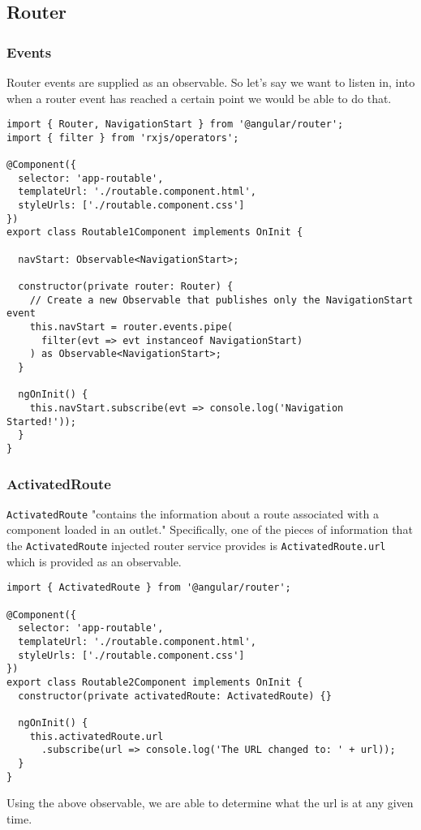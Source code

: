 \subsection{ Router }
\subsubsection{Events}
Router events are supplied as an observable. So let's say we want to listen 
in, into when a router event has reached a certain point we would be able to 
do that. 
\begin{lstlisting}
import { Router, NavigationStart } from '@angular/router';
import { filter } from 'rxjs/operators';

@Component({
  selector: 'app-routable',
  templateUrl: './routable.component.html',
  styleUrls: ['./routable.component.css']
})
export class Routable1Component implements OnInit {

  navStart: Observable<NavigationStart>;

  constructor(private router: Router) {
    // Create a new Observable that publishes only the NavigationStart event
    this.navStart = router.events.pipe(
      filter(evt => evt instanceof NavigationStart)
    ) as Observable<NavigationStart>;
  }

  ngOnInit() {
    this.navStart.subscribe(evt => console.log('Navigation Started!'));
  }
}
\end{lstlisting}

\subsubsection{ ActivatedRoute }
\lstinline{ActivatedRoute} "contains the information about a route associated
with a component loaded in an outlet." Specifically, one of the pieces of 
information that the \lstinline{ActivatedRoute} injected router service 
provides is \lstinline{ActivatedRoute.url} which is provided as an observable. 

\begin{lstlisting}
import { ActivatedRoute } from '@angular/router';

@Component({
  selector: 'app-routable',
  templateUrl: './routable.component.html',
  styleUrls: ['./routable.component.css']
})
export class Routable2Component implements OnInit {
  constructor(private activatedRoute: ActivatedRoute) {}

  ngOnInit() {
    this.activatedRoute.url
      .subscribe(url => console.log('The URL changed to: ' + url));
  }
}
\end{lstlisting}
Using the above observable, we are able to determine what the url is at any
given time. 